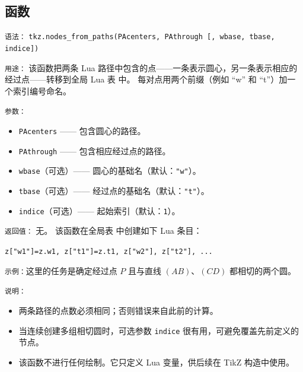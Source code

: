 \subsection{函数 }
\label{sub:tkz_nodes_from_paths}

\texttt{语法：}
\verb|tkz.nodes_from_paths(PAcenters, PAthrough [, wbase, tbase, indice])|

\texttt{用途：}
该函数把两条 Lua 路径中包含的点——一条表示圆心，另一条表示相应的经过点——转移到全局 Lua 表  中。
每对点用两个前缀（例如 “w” 和 “t”）加一个索引编号命名。

\texttt{参数：}
\begin{itemize}
  \item \verb|PAcenters| —— 包含圆心的路径。
  \item \verb|PAthrough| —— 包含相应经过点的路径。
  \item \verb|wbase|（可选）—— 圆心的基础名（默认：\verb|"w"|）。
  \item \verb|tbase|（可选）—— 经过点的基础名（默认：\verb|"t"|）。
  \item \verb|indice|（可选）—— 起始索引（默认：\verb|1|）。
\end{itemize}

\texttt{返回值：}
无。
该函数在全局表  中创建如下 Lua 条目：

\verb|z["w1"]=z.w1, z["t1"]=z.t1, z["w2"], z["t2"], ...|

\texttt{示例：}这里的任务是确定经过点 $P$ 且与直线 $(AB)$、$(CD)$ 都相切的两个圆。

\begin{tkzexample}[latex=.5\textwidth]
 \end{tkzexample}

\texttt{说明：}
\begin{itemize}
  \item 两条路径的点数必须相同；否则错误来自此前的计算。
  \item 当连续创建多组相切圆时，可选参数 \verb|indice| 很有用，可避免覆盖先前定义的节点。
  \item 该函数不进行任何绘制。它只定义 Lua 变量，供后续在 TikZ 构造中使用。
\end{itemize}

